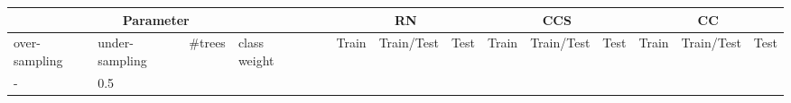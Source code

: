 \begin{table}[]
\tiny
\tabcolsep=0.11cm
\begin{tabularx}{\textwidth}{XXlllllllllllll@{}}
\toprule
\multicolumn{4}{c}{Parameter}                                                                                                                                                              & &                                                                     & \multicolumn{3}{c}{RN}                                                                                                                                                                         & \multicolumn{3}{c}{CCS}                                                                                                                                                                           & \multicolumn{3}{c}{CC}                                                                                                                                                                            \\ \midrule
over-\newline sampling                                                       & under-\newline sampling                                                       & \#trees                                                     & class weight          & &                                & Train                                                        & Train/Test                                                        & Test                                                        & Train                                                         & Train/Test                                                         & Test                                                         & Train                                                         & Train/Test                                                         & Test                                                         \\ \midrule
- & 0.5 &  &  &                                                              &                                                                   &                                                             &                                                               &                                                                    &                                                              &                                                               &                                                                    &                                                              \\

\end{tabularx}
\end{table}
